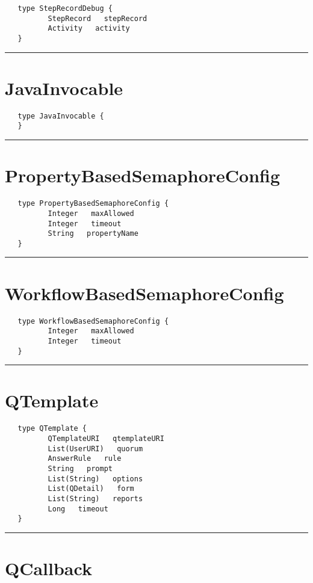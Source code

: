 \begin{verbatim}
   type StepRecordDebug {
          StepRecord   stepRecord
          Activity   activity
   }
\end{verbatim}

\rule{15cm}{2pt}
\section{JavaInvocable}
\label{type:JavaInvocable}

\begin{verbatim}
   type JavaInvocable {
   }
\end{verbatim}

\rule{15cm}{2pt}
\section{PropertyBasedSemaphoreConfig}
\label{type:PropertyBasedSemaphoreConfig}

\begin{verbatim}
   type PropertyBasedSemaphoreConfig {
          Integer   maxAllowed
          Integer   timeout
          String   propertyName
   }
\end{verbatim}

\rule{15cm}{2pt}
\section{WorkflowBasedSemaphoreConfig}
\label{type:WorkflowBasedSemaphoreConfig}

\begin{verbatim}
   type WorkflowBasedSemaphoreConfig {
          Integer   maxAllowed
          Integer   timeout
   }
\end{verbatim}

\rule{15cm}{2pt}
\section{QTemplate}
\label{type:QTemplate}

\begin{verbatim}
   type QTemplate {
          QTemplateURI   qtemplateURI
          List(UserURI)   quorum
          AnswerRule   rule
          String   prompt
          List(String)   options
          List(QDetail)   form
          List(String)   reports
          Long   timeout
   }
\end{verbatim}

\rule{15cm}{2pt}
\section{QCallback}
\label{type:QCallback}

